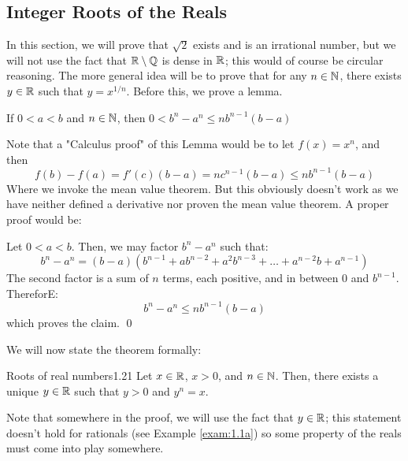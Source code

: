 \subsection{Integer Roots of the Reals}
In this section, we will prove that $\sqrt{2}$ exists and is an irrational number, but we will not use the fact that $\mathbb{R} \setminus \mathbb{Q}$ is dense in $\mathbb{R}$; this would of course be circular reasoning. The more general idea will be to prove that for any $n \in \mathbb{N}$, there exists $y \in \mathbb{R}$ such that $y = x^{1/n}$. Before this, we prove a lemma.
\begin{nlemma}{}
    If $0 < a < b$ and $n \in \mathbb{N}$, then $0 < b^n - a^n \leq nb^{n-1}(b-a)$
\end{nlemma}
\noindent Note that a "Calculus proof" of this Lemma would be to let $f(x) = x^n$, and then
\[f(b) - f(a) = f'(c)(b-a) = nc^{n-1}(b-a) \leq nb^{n-1}(b-a)\]
Where we invoke the mean value theorem. But this obviously doesn't work as we have neither defined a derivative nor proven the mean value theorem. A proper proof would be:
\begin{nproof}
    Let $0 < a < b$. Then, we may factor $b^n - a^n$ such that:
    \[b^n - a^n = (b-a)(b^{n-1} + ab^{n-2} + a^2b^{n-3} + \ldots + a^{n-2}b + a^{n-1})\]
    The second factor is a sum of $n$ terms, each positive, and in between $0$ and $b^{n-1}$. ThereforE:
    \[b^n - a^n \leq nb^{n-1}(b-a)\]
    which proves the claim. \qed
\end{nproof}
\noindent We will now state the theorem formally:
\begin{theorem}{Roots of real numbers}{1.21}
    Let $x \in \mathbb{R}$, $x > 0$, and $n \in \mathbb{N}$. Then, there exists a unique $y \in \mathbb{R}$ such that $y > 0$ and $y^n = x$. 
\end{theorem}
\noindent Note that somewhere in the proof, we will use the fact that $y \in \mathbb{R}$; this statement doesn't hold for rationals (see Example \ref{exam:1.1a}) so some property of the reals must come into play somewhere.
